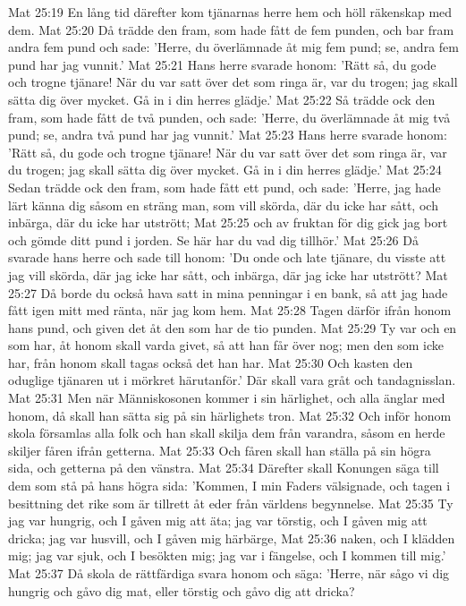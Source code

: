 Mat 25:19  En lång tid därefter kom tjänarnas herre hem och höll räkenskap med dem.
Mat 25:20  Då trädde den fram, som hade fått de fem punden, och bar fram andra fem pund och sade: 'Herre, du överlämnade åt mig fem pund; se, andra fem pund har jag vunnit.'
Mat 25:21  Hans herre svarade honom: 'Rätt så, du gode och trogne tjänare! När du var satt över det som ringa är, var du trogen; jag skall sätta dig över mycket. Gå in i din herres glädje.'
Mat 25:22  Så trädde ock den fram, som hade fått de två punden, och sade: 'Herre, du överlämnade åt mig två pund; se, andra två pund har jag vunnit.'
Mat 25:23  Hans herre svarade honom: 'Rätt så, du gode och trogne tjänare! När du var satt över det som ringa är, var du trogen; jag skall sätta dig över mycket. Gå in i din herres glädje.'
Mat 25:24  Sedan trädde ock den fram, som hade fått ett pund, och sade: 'Herre, jag hade lärt känna dig såsom en sträng man, som vill skörda, där du icke har sått, och inbärga, där du icke har utstrött;
Mat 25:25  och av fruktan för dig gick jag bort och gömde ditt pund i jorden. Se här har du vad dig tillhör.'
Mat 25:26  Då svarade hans herre och sade till honom: 'Du onde och late tjänare, du visste att jag vill skörda, där jag icke har sått, och inbärga, där jag icke har utstrött?
Mat 25:27  Då borde du också hava satt in mina penningar i en bank, så att jag hade fått igen mitt med ränta, när jag kom hem.
Mat 25:28  Tagen därför ifrån honom hans pund, och given det åt den som har de tio punden.
Mat 25:29  Ty var och en som har, åt honom skall varda givet, så att han får över nog; men den som icke har, från honom skall tagas också det han har.
Mat 25:30  Och kasten den oduglige tjänaren ut i mörkret härutanför.' Där skall vara gråt och tandagnisslan.
Mat 25:31  Men när Människosonen kommer i sin härlighet, och alla änglar med honom, då skall han sätta sig på sin härlighets tron.
Mat 25:32  Och inför honom skola församlas alla folk och han skall skilja dem från varandra, såsom en herde skiljer fåren ifrån getterna.
Mat 25:33  Och fåren skall han ställa på sin högra sida, och getterna på den vänstra.
Mat 25:34  Därefter skall Konungen säga till dem som stå på hans högra sida: 'Kommen, I min Faders välsignade, och tagen i besittning det rike som är tillrett åt eder från världens begynnelse.
Mat 25:35  Ty jag var hungrig, och I gåven mig att äta; jag var törstig, och I gåven mig att dricka; jag var husvill, och I gåven mig härbärge,
Mat 25:36  naken, och I klädden mig; jag var sjuk, och I besökten mig; jag var i fängelse, och I kommen till mig.'
Mat 25:37  Då skola de rättfärdiga svara honom och säga: 'Herre, när sågo vi dig hungrig och gåvo dig mat, eller törstig och gåvo dig att dricka?
